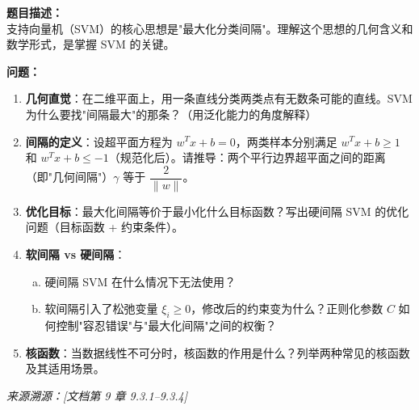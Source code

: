 \documentclass[a4paper,11pt]{ctexart}
\begin{document}
\begin{problembox}
    \textbf{题目描述：}\\
    支持向量机（SVM）的核心思想是"最大化分类间隔"。理解这个思想的几何含义和数学形式，是掌握 SVM 的关键。

    \vspace{0.3cm}
    \textbf{问题：}
    \begin{enumerate}[(1)]
        \item \textbf{几何直觉}：在二维平面上，用一条直线分类两类点有无数条可能的直线。SVM 为什么要找"间隔最大"的那条？（用泛化能力的角度解释）

        \item \textbf{间隔的定义}：设超平面方程为 $w^T x + b = 0$，两类样本分别满足 $w^T x + b \geq 1$ 和 $w^T x + b \leq -1$（规范化后）。请推导：两个平行边界超平面之间的距离（即"几何间隔"）$\gamma$ 等于 $\dfrac{2}{\|w\|}$。

        \item \textbf{优化目标}：最大化间隔等价于最小化什么目标函数？写出硬间隔 SVM 的优化问题（目标函数 + 约束条件）。

        \item \textbf{软间隔 vs 硬间隔}：
        \begin{enumerate}[a.]
            \item 硬间隔 SVM 在什么情况下无法使用？
            \item 软间隔引入了松弛变量 $\xi_i \geq 0$，修改后的约束变为什么？正则化参数 $C$ 如何控制"容忍错误"与"最大化间隔"之间的权衡？
        \end{enumerate}

        \item \textbf{核函数}：当数据线性不可分时，核函数的作用是什么？列举两种常见的核函数及其适用场景。
    \end{enumerate}

    \vspace{0.2cm}
    {\color{gray}\small\textit{来源溯源：[文档第 9 章 9.3.1--9.3.4]}}
\end{problembox}
\end{document}
